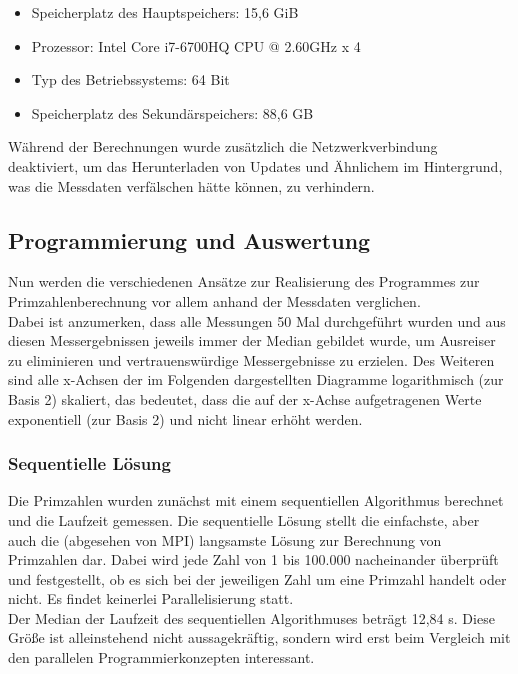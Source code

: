 			\begin{itemize}
				\item Speicherplatz des Hauptspeichers: 15,6 GiB
				\item Prozessor: Intel Core i7-6700HQ CPU @ 2.60GHz x 4
				\item Typ des Betriebssystems: 64 Bit
				\item Speicherplatz des Sekundärspeichers: 88,6 GB
			\end{itemize}
		
			Während der Berechnungen wurde zusätzlich die Netzwerkverbindung deaktiviert, um das Herunterladen von Updates und Ähnlichem im Hintergrund, was die Messdaten verfälschen hätte können, zu verhindern.
		
		\subsection{Programmierung und Auswertung}
		
			Nun werden die verschiedenen Ansätze zur Realisierung des Programmes zur Primzahlenberechnung vor allem anhand der Messdaten verglichen.\\
			Dabei ist anzumerken, dass alle Messungen 50 Mal durchgeführt wurden und aus diesen Messergebnissen jeweils immer der Median gebildet wurde, um Ausreiser zu eliminieren und vertrauenswürdige Messergebnisse zu erzielen. Des Weiteren sind alle x-Achsen der im Folgenden dargestellten Diagramme logarithmisch (zur Basis 2) skaliert, das bedeutet, dass die auf der x-Achse aufgetragenen Werte exponentiell (zur Basis 2) und nicht linear erhöht werden.
		
			\subsubsection{Sequentielle Lösung}
			
				Die Primzahlen wurden zunächst mit einem sequentiellen Algorithmus berechnet und die Laufzeit gemessen. Die sequentielle Lösung stellt die einfachste, aber auch die (abgesehen von MPI) langsamste Lösung zur Berechnung von Primzahlen dar. Dabei wird jede Zahl von 1 bis 100.000 nacheinander überprüft und festgestellt, ob es sich bei der jeweiligen Zahl um eine Primzahl handelt oder nicht. Es findet keinerlei Parallelisierung statt.\\
				Der Median der Laufzeit des sequentiellen Algorithmuses beträgt 12,84 s. Diese Größe ist alleinstehend nicht aussagekräftig, sondern wird erst beim Vergleich mit den parallelen Programmierkonzepten interessant.
			
